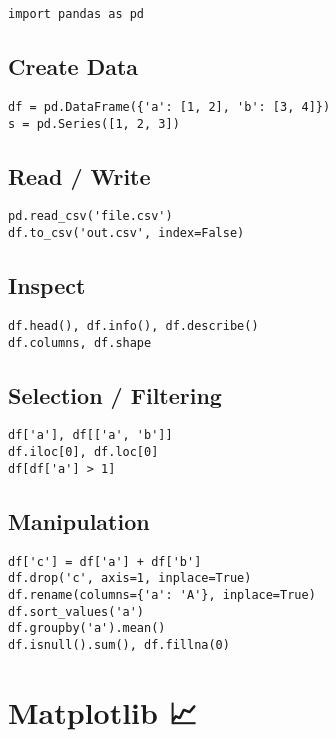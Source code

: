 \documentclass[a4paper,10pt]{article}
\begin{document}
\begin{tcolorbox}[colback=lightgray, title=Import]
\begin{Verbatim}[fontsize=\small]
import pandas as pd
\end{Verbatim}
\end{tcolorbox}

\subsection*{Create Data}
\begin{Verbatim}[fontsize=\small]
df = pd.DataFrame({'a': [1, 2], 'b': [3, 4]})
s = pd.Series([1, 2, 3])
\end{Verbatim}

\subsection*{Read / Write}
\begin{Verbatim}[fontsize=\small]
pd.read_csv('file.csv')
df.to_csv('out.csv', index=False)
\end{Verbatim}

\subsection*{Inspect}
\begin{Verbatim}[fontsize=\small]
df.head(), df.info(), df.describe()
df.columns, df.shape
\end{Verbatim}

\subsection*{Selection / Filtering}
\begin{Verbatim}[fontsize=\small]
df['a'], df[['a', 'b']]
df.iloc[0], df.loc[0]
df[df['a'] > 1]
\end{Verbatim}

\subsection*{Manipulation}
\begin{Verbatim}[fontsize=\small]
df['c'] = df['a'] + df['b']
df.drop('c', axis=1, inplace=True)
df.rename(columns={'a': 'A'}, inplace=True)
df.sort_values('a')
df.groupby('a').mean()
df.isnull().sum(), df.fillna(0)
\end{Verbatim}

\section*{\color{matpyred}Matplotlib 📈}
\end{document}
